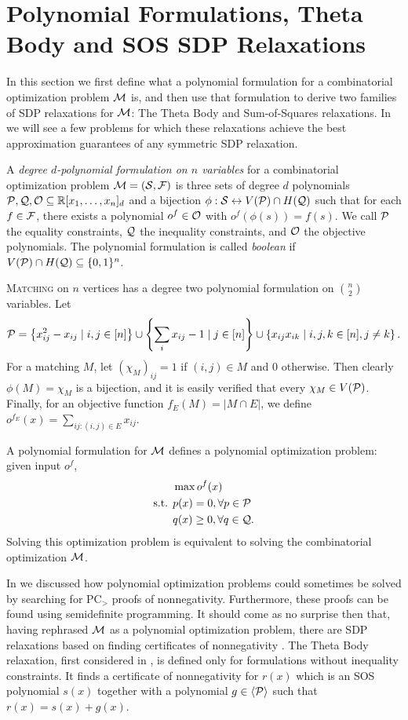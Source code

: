 \section{Polynomial Formulations, Theta Body and SOS SDP Relaxations}\label{sec:polyforms}
In this section we first define what a polynomial formulation for a combinatorial optimization problem $\mathcal M$ is, and then use that formulation to derive two families of SDP relaxations for $\mathcal M$: The Theta Body and Sum-of-Squares relaxations. In  we will see a few problems for which these relaxations achieve the best approximation guarantees of any symmetric SDP relaxation.
\begin{definition}
A \emph{degree $d$-polynomial formulation on $n$ variables} for a combinatorial optimization problem $\mathcal M = (\mathcal S, \mathcal F)$ is three sets of degree $d$ polynomials $\mathcal P,\mathcal Q,\mathcal O \subseteq \mathbb R[x_1,\dots,x_n]_d$ and a bijection $\phi: \mathcal S \leftrightarrow V(\mathcal P) \cap H(\mathcal Q)$ such that for each $f \in \mathcal F$, there exists a polynomial $o^f \in \mathcal O$ with $o^f(\phi(s)) = f(s)$. We call $\mathcal P$ the equality constraints, $\mathcal Q$ the inequality constraints, and $\mathcal O$ the objective polynomials. The polynomial formulation is called \emph{boolean} if $V(\mathcal P) \cap H(\mathcal Q) \subseteq \{0,1\}^n$.
\end{definition}
\begin{example}
\textsc{Matching} on $n$ vertices has a degree two polynomial formulation on $\binom{n}{2}$ variables. Let
\[\mathcal P = \left\{x_{ij}^2 - x_{ij} \mid i,j \in [n]\right\} \cup \left\{\sum_i x_{ij} - 1 \mid j \in [n]\right\} \cup \left\{x_{ij}x_{ik} \mid i,j,k \in [n], j\neq k\right\}.\]
For a matching $M$, let $(\chi_M)_{ij} = 1$ if $(i,j) \in M$ and $0$ otherwise. Then clearly $\phi(M) = \chi_M$ is a bijection, and it is easily verified that every $\chi_M \in V(\mathcal P)$. Finally, for an objective function $f_E(M) = |M \cap E|$, we define $o^{f_E}(x) = \sum_{ij: (i,j) \in E} x_{ij}$.
\end{example}
A polynomial formulation for $\mathcal M$ defines a polynomial optimization problem: given input $o^f$,
\begin{align*}
&\max o^f(x) \\
\text{s.t. } &p(x) = 0, \forall p \in \mathcal P \\
&q(x) \geq 0, \forall q \in \mathcal Q.
\end{align*}
Solving this optimization problem is equivalent to solving the combinatorial optimization  $\mathcal M$.

In  we discussed how polynomial optimization problems could sometimes be solved by searching for PC$_>$ proofs of nonnegativity. Furthermore, these proofs can be found using semidefinite programming. It should come as no surprise then that, having rephrased $\mathcal M$ as a polynomial optimization problem, there are SDP relaxations based on finding certificates of nonnegativity . The Theta Body relaxation, first considered in \cite{GPT10}, is defined only for formulations without inequality constraints. It finds a certificate of nonnegativity for $r(x)$ which is an SOS polynomial $s(x)$ together with a polynomial $g \in \langle \mathcal P \rangle$ such that $r(x) = s(x) + g(x)$.

